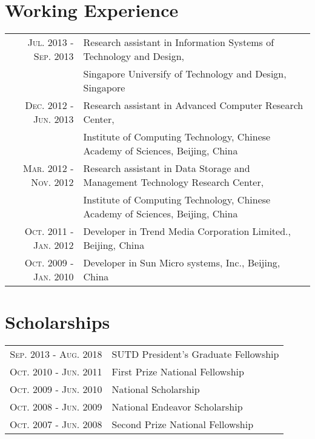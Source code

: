 \documentclass[a4paper,10pt]{article}
\begin{document}
\section{Working Experience}
\begin{tabular}{rl}	
	\textsc{Jul.} 2013 - \textsc{Sep.} 2013  & Research assistant in Information Systems of Technology and Design,\\
		 									 & Singapore Universify of Technology and Design, Singapore \\
	\textsc{Dec.} 2012 - \textsc{Jun.} 2013	 & Research assistant in Advanced Computer Research Center,\\
		 									 & Institute of Computing Technology, Chinese Academy of Sciences, Beijing, China \\
	\textsc{Mar.} 2012 - \textsc{Nov.} 2012  & Research assistant in Data Storage and Management Technology Research Center, \\
											 & Institute of Computing Technology, Chinese Academy of Sciences, Beijing, China \\
	\textsc{Oct.} 2011 - \textsc{Jan.} 2012  & Developer in Trend Media Corporation Limited., Beijing, China\\
	\textsc{Oct.} 2009 - \textsc{Jan.} 2010  & Developer in Sun Micro systems, Inc., Beijing, China\\
\end{tabular}






\section{Scholarships}
\begin{tabular}{rl}
\textsc{Sep.} 2013 - \textsc{Aug.} 2018 & SUTD President’s Graduate Fellowship \\
\textsc{Oct.} 2010 - \textsc{Jun.} 2011 & First Prize National Fellowship \\
\textsc{Oct.} 2009 - \textsc{Jun.} 2010 & National Scholarship \\
\textsc{Oct.} 2008 - \textsc{Jun.} 2009 & National Endeavor Scholarship \\
\textsc{Oct.} 2007 - \textsc{Jun.} 2008 & Second Prize National Fellowship \\
\end{tabular}



\end{document}
